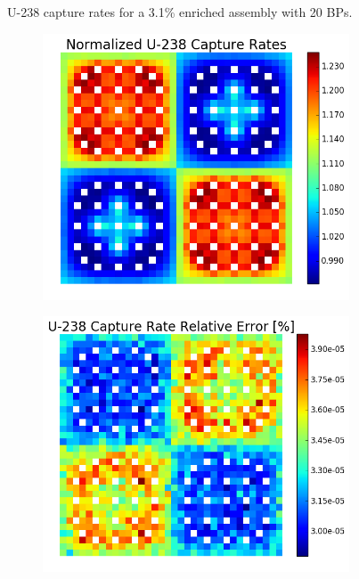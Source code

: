 \begin{figure}[h!]
\begin{subfigure}{0.5\textwidth}
  \caption{}
  \label{fig:chap7-capt-rate-rel-err-3.1-20BAs-assm}
\end{subfigure}%
\caption[U-238 capture rates for a 3.1\% enriched assembly with 20 BPs]{U-238 capture rates for a 3.1\% enriched assembly with 20 \ac{BP}s.}
\label{fig:chap7-capt-rates-3.1-assm-20BAs}
\end{figure}

\begin{figure}[h!]
\centering
\begin{subfigure}{0.5\textwidth}
  \centering
  \includegraphics[width=\linewidth]{figures/benchmarks/capture-rates/capt-mean-2x2}
  \caption{}
  \label{fig:chap7-capt-rate-mean-2x2}
\end{subfigure}%
\begin{subfigure}{0.5\textwidth}
  \centering
  \includegraphics[width=\linewidth]{figures/benchmarks/capture-rates/capt-rel-err-2x2}

\end{subfigure}
\end{figure}
